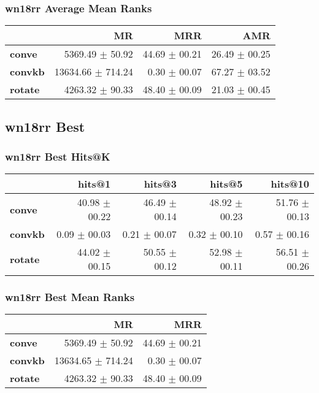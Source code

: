 \documentclass{article}
\begin{document}
\subsubsection{wn18rr Average Mean Ranks}
    \begin{center}
    \begin{tabular}{lrrr}
\toprule
{} &                 MR &            MRR &            AMR \\
\midrule
\textbf{conve } &    5369.49 $\pm$ 50.92 &  44.69 $\pm$ 00.21 &  26.49 $\pm$ 00.25 \\
\textbf{convkb} &  13634.66 $\pm$ 714.24 &   0.30 $\pm$ 00.07 &  67.27 $\pm$ 03.52 \\
\textbf{rotate} &    4263.32 $\pm$ 90.33 &  48.40 $\pm$ 00.09 &  21.03 $\pm$ 00.45 \\
\bottomrule
\end{tabular}

    \end{center}
\subsection{wn18rr Best}
\subsubsection{wn18rr Best Hits@K}
    \begin{center}
    \begin{tabular}{lrrrr}
\toprule
{} &         hits@1 &         hits@3 &         hits@5 &        hits@10 \\
\midrule
\textbf{conve } &  40.98 $\pm$ 00.22 &  46.49 $\pm$ 00.14 &  48.92 $\pm$ 00.23 &  51.76 $\pm$ 00.13 \\
\textbf{convkb} &   0.09 $\pm$ 00.03 &   0.21 $\pm$ 00.07 &   0.32 $\pm$ 00.10 &   0.57 $\pm$ 00.16 \\
\textbf{rotate} &  44.02 $\pm$ 00.15 &  50.55 $\pm$ 00.12 &  52.98 $\pm$ 00.11 &  56.51 $\pm$ 00.26 \\
\bottomrule
\end{tabular}

    \end{center}
\subsubsection{wn18rr Best Mean Ranks}
    \begin{center}
    \begin{tabular}{lrr}
\toprule
{} &                 MR &            MRR \\
\midrule
\textbf{conve } &    5369.49 $\pm$ 50.92 &  44.69 $\pm$ 00.21 \\
\textbf{convkb} &  13634.65 $\pm$ 714.24 &   0.30 $\pm$ 00.07 \\
\textbf{rotate} &    4263.32 $\pm$ 90.33 &  48.40 $\pm$ 00.09 \\
\bottomrule
\end{tabular}

    \end{center}
\end{document}
